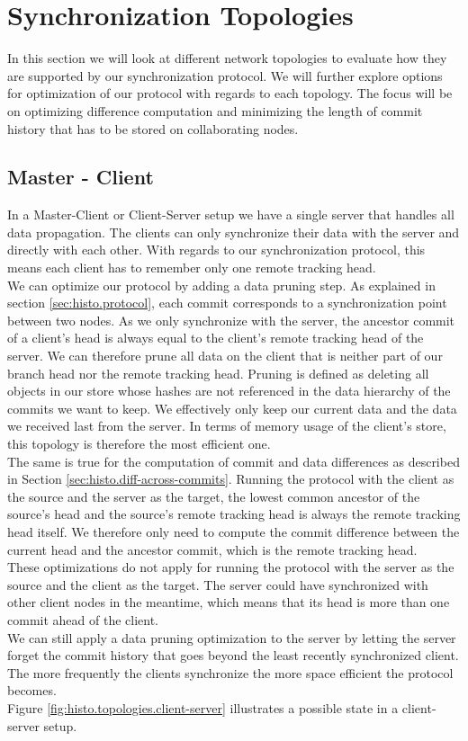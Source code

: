 
\section{Synchronization Topologies}
\label{sec:histo.topologies}

In this section we will look at different network topologies to evaluate how they are supported by our synchronization protocol.
We will further explore options for optimization of our protocol with regards to each topology.
The focus will be on optimizing difference computation and minimizing the length of commit history that has to be stored on collaborating nodes.

\subsection{Master - Client}
\label{sec:histo.topologies.master-client}
In a Master-Client or Client-Server setup we have a single server that handles all data propagation.
The clients can only synchronize their data with the server and directly with each other.
With regards to our synchronization protocol, this means each client has to remember only one remote tracking head.\\
We can optimize our protocol by adding a data pruning step.
As explained in section \ref{sec:histo.protocol}, each commit corresponds to a synchronization point between two nodes.
As we only synchronize with the server, the ancestor commit of a client's head is always equal to the client's remote tracking head of the server.
We can therefore prune all data on the client that is neither part of our branch head nor the remote tracking head.
Pruning is defined as deleting all objects in our store whose hashes are not referenced in the data hierarchy of the commits we want to keep.
We effectively only keep our current data and the data we received last from the server.
In terms of memory usage of the client's store, this topology is therefore the most efficient one.\\
The same is true for the computation of commit and data differences as described in Section \ref{sec:histo.diff-across-commits}.
Running the protocol with the client as the source and the server as the target, the lowest common ancestor of the source's head and the source's remote tracking head is always the remote tracking head itself.
We therefore only need to compute the commit difference between the current head and the ancestor commit, which is the remote tracking head.\\
These optimizations do not apply for running the protocol with the server as the source and the client as the target.
The server could have synchronized with other client nodes in the meantime, which means that its head is more than one commit ahead of the client.\\
We can still apply a data pruning optimization to the server by letting the server forget the commit history that goes beyond the least recently synchronized client.
The more frequently the clients synchronize the more space efficient the protocol becomes.\\
Figure \ref{fig:histo.topologies.client-server} illustrates a possible state in a client-server setup.

